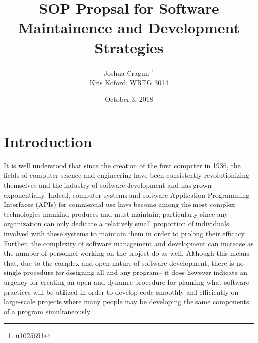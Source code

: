 \documentclass[12pt, letterpaper]{article}
\title{SOP Propsal for Software Maintainence and Development Strategies}
\author{Joshua Cragun \thanks{u1025691} \\ Kris Koford, WRTG 3014}
\date{October 3, 2018}
\begin{document}
\begin{titlepage}
\maketitle
\end{titlepage}

\pagebreak

\section{Introduction}
  It is well understood that since the creation of the first computer in 1936, the fields of computer science and engineering have been consistently revolutionizing themselves and the industry of
  software development and has grown exponentially. Indeed, computer systems and software Application Programming Interfaces (APIs) for commercial use have become among the most complex technologies
  mankind produces and must maintain; particularly since any organization can only dedicate a relatively small proportion of individuals involved with these systems to maintain them in order to
  prolong their efficacy. Further, the complexity of software management and development can increase as the number of personnel working on the project do as well. Although this means that, due to the
  complex and open nature of software development, there is no single procedure for designing all and any program-- it does however indicate an urgency for creating an open and dynamic procedure for planning
  what software practices will be utilized in order to develop code smoothly and efficiently on large-scale projects where many people may be developing the same components of a program simultaneously.
\end{document}
